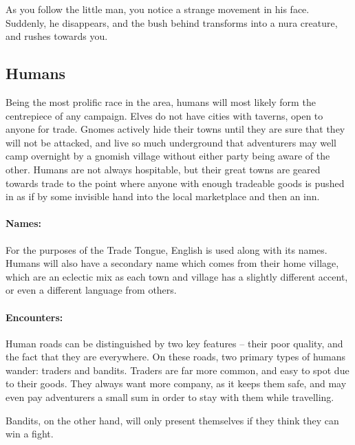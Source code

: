 \begin{multicols}{2}
\begin{boxtext}

	As you follow the little man, you notice a strange movement in his face.
	Suddenly, he disappears, and the bush behind transforms into a nura creature, and rushes towards you.

\end{boxtext}

\subsection{Humans}

Being the most prolific race in the area, humans will most likely form the centrepiece of any campaign.  Elves do not have cities with taverns, open to anyone for trade.  Gnomes actively hide their towns until they are sure that they will not be attacked, and live so much underground that adventurers may well camp overnight by a gnomish village without either party being aware of the other.  Humans are not always hospitable, but their great towns are geared towards trade to the point where anyone with enough tradeable goods is pushed in as if by some invisible hand into the local marketplace and then an inn.

\paragraph{Names:} For the purposes of the Trade Tongue, English is used along with its names.
Humans will also have a secondary name which comes from their home village, which are an eclectic mix as each town and village has a slightly different accent, or even a different language from others.

\paragraph{Encounters:} Human roads can be distinguished by two key features -- their poor quality, and the fact that they are everywhere.
On these roads, two primary types of humans wander: traders and bandits.
Traders are far more common, and easy to spot due to their goods.
They always want more company, as it keeps them safe, and may even pay adventurers a small sum in order to stay with them while travelling.

Bandits, on the other hand, will only present themselves if they think they can win a fight.

\label{human_trader}


\end{multicols}
